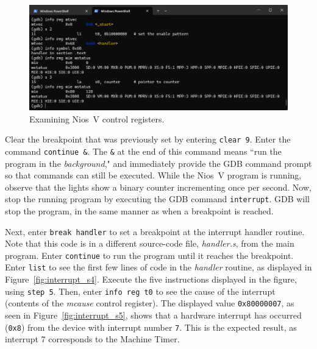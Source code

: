 \documentclass[11pt, twoside, pdftex]{article}
\newcommand{\red}[1]{{\color{red}\sf{#1}}}
\begin{document}
\begin{figure}[h]
    \begin{center}
        \includegraphics[scale=.6]{figures/interrupt_s3.png}
        \caption{Examining Nios~V control registers.}
        \label{fig:interrupt_s3}
    \end{center}
\end{figure}

Clear the breakpoint that was previously set by entering \texttt{clear 9}. 
Enter the command \texttt{continue \&}. The \texttt{\&} at the end of this command means
``run the program in the {\it background}," and immediately provide the GDB command prompt so
that commands can still be executed. While the Nios~V program is running, observe that the 
\red{{\it LEDR}} lights show a binary counter incrementing once per second.  Now, stop the 
running program by executing the GDB command \texttt{interrupt}. GDB will stop the
program, in the same manner as when a breakpoint is reached.

Next, enter \texttt{break handler} to set a breakpoint at the interrupt handler routine.
Note that this code is in a different source-code file, {\it handler.s}, from the main program.
Enter \texttt{continue} to run the program until it reaches the breakpoint. Enter
\texttt{list} to see the first few lines of code in the {\it handler} routine, as displayed in
Figure~\ref{fig:interrupt_s4}. Execute the five instructions displayed in the figure, using
\texttt{step 5}. Then, enter \texttt{info reg t0} to see the cause of the interrupt
(contents of the {\it mcause} control register). The displayed value \texttt{0x80000007}, as 
seen in Figure~\ref{fig:interrupt_s5}, shows that a hardware interrupt has occurred (\texttt{0x8})
from the device with interrupt number \texttt{7}. This is the expected result, as
interrupt 7 corresponds to the Machine Timer. 
\end{document}
